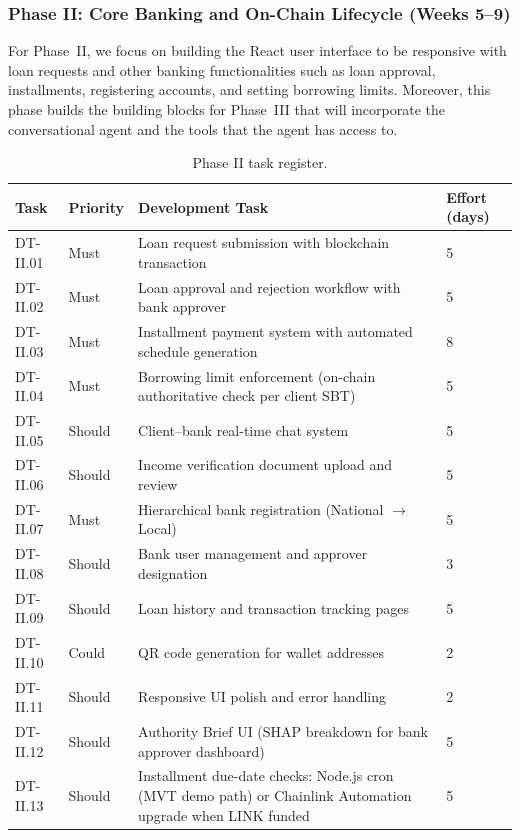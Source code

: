 \documentclass[12pt,a4paper]{report}
\newcommand{\tableheadcolor}{\rowcolor{TableHeadBg}}
\begin{document}
\subsubsection{Phase II: Core Banking and On-Chain Lifecycle (Weeks 5--9)}

For Phase~II, we focus on building the React user interface to be responsive with loan requests and other banking functionalities such as loan approval, installments, registering accounts, and setting borrowing limits. Moreover, this phase builds the building blocks for Phase~III that will incorporate the conversational agent and the tools that the agent has access to.

\begin{table}[H]
\centering
\caption[Phase II task register]{Phase II task register.}
\label{tab:phaseII-tasks}
\begin{tabular}{p{1.8cm}p{1.8cm}p{7.5cm}p{1.5cm}}
\toprule
\tableheadcolor
\textbf{Task} & \textbf{Priority} & \textbf{Development Task} & \textbf{Effort (days)} \\
\midrule
DT-II.01 & Must & Loan request submission with blockchain transaction & 5 \\
DT-II.02 & Must & Loan approval and rejection workflow with bank approver & 5 \\
DT-II.03 & Must & Installment payment system with automated schedule generation & 8 \\
DT-II.04 & Must & Borrowing limit enforcement (on-chain authoritative check per client SBT) & 5 \\
DT-II.05 & Should & Client--bank real-time chat system & 5 \\
DT-II.06 & Should & Income verification document upload and review & 5 \\
DT-II.07 & Must & Hierarchical bank registration (National $\to$ Local) & 5 \\
DT-II.08 & Should & Bank user management and approver designation & 3 \\
DT-II.09 & Should & Loan history and transaction tracking pages & 5 \\
DT-II.10 & Could & QR code generation for wallet addresses & 2 \\
DT-II.11 & Should & Responsive UI polish and error handling & 2 \\
DT-II.12 & Should & Authority Brief UI (SHAP breakdown for bank approver dashboard) & 5 \\
DT-II.13 & Should & Installment due-date checks: Node.js cron (MVT demo path) or Chainlink Automation upgrade when LINK funded & 5 \\

\end{tabular}
\end{table}
\end{document}
